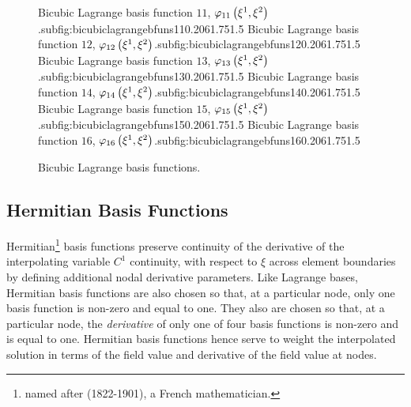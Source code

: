 \begin{figure}[hbtp]
     {Bicubic Lagrange basis function $11$, $   \varphi_{11} \left( \xi^{1},\xi^{2} \right)  $.}{subfig:bicubiclagrangebfuns11}{0.20\linewidth}{6}{1.75}{1.5}
   \hfil
     {Bicubic Lagrange basis function $12$, $   \varphi_{12} \left( \xi^{1},\xi^{2} \right)  $.}{subfig:bicubiclagrangebfuns12}{0.20\linewidth}{6}{1.75}{1.5}
     {Bicubic Lagrange basis function $13$, $   \varphi_{13} \left( \xi^{1},\xi^{2} \right)  $.}{subfig:bicubiclagrangebfuns13}{0.20\linewidth}{6}{1.75}{1.5}
   \hfil
     {Bicubic Lagrange basis function $14$, $   \varphi_{14} \left( \xi^{1},\xi^{2} \right)  $.}{subfig:bicubiclagrangebfuns14}{0.20\linewidth}{6}{1.75}{1.5}
   \hfil
     {Bicubic Lagrange basis function $15$, $   \varphi_{15} \left( \xi^{1},\xi^{2} \right)  $.}{subfig:bicubiclagrangebfuns15}{0.20\linewidth}{6}{1.75}{1.5}
   \hfil
     {Bicubic Lagrange basis function $16$, $   \varphi_{16} \left( \xi^{1},\xi^{2} \right)  $.}{subfig:bicubiclagrangebfuns16}{0.20\linewidth}{6}{1.75}{1.5}
   \caption[Bicubic Lagrange basis functions.]{Bicubic Lagrange basis functions.}
   \label{fig:bicubiclagrangebfuns}
\end{figure}

\subsection{Hermitian Basis Functions}
\label{sec:Hermitianbasisfunctions}

Hermitian\footnote{named after
(1822-1901), a French mathematician.} basis functions preserve
continuity of the derivative of the interpolating variable \ie $C^{1}$
continuity, with respect to $\xi$ across element boundaries by
defining additional nodal derivative parameters. Like Lagrange bases,
Hermitian basis functions are also chosen so that, at a particular
node, only one basis function is non-zero and equal to one. They also
are chosen so that, at a particular node, the \emph{derivative} of
only one of four basis functions is non-zero and is equal to
one. Hermitian basis functions hence serve to weight the interpolated
solution in terms of the field value and derivative of the field value
at nodes.


